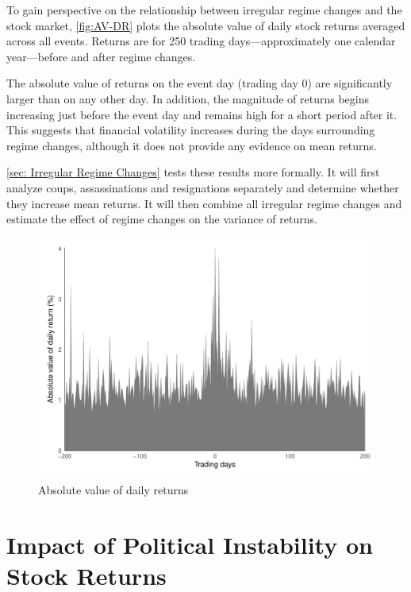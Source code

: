 \documentclass[12pt,final,fleqn]{article}
\theoremstyle{plain}
\begin{document}
To gain perspective on the relationship between irregular regime changes and the stock market, \autoref{fig:AV-DR} plots the absolute value of daily stock returns averaged across all events. Returns are for 250 trading days---approximately one calendar year---before and after regime changes.

The absolute value of returns on the event day (trading day 0) are significantly larger than on any other day. In addition, the magnitude of returns begins increasing just before the event day and remains high for a short period after it. This suggests that financial volatility increases during the days surrounding regime changes, although it does not provide any evidence on mean returns.

\autoref{sec: Irregular Regime Changes} tests these results more formally. It will first analyze coups, assassinations and resignations separately and determine whether they increase mean returns. It will then combine all irregular regime changes and estimate the effect of regime changes on the variance of returns.

\begin{figure}[!ht]
\includegraphics{../figs/daily_mean_absreturn.pdf}
\caption{Absolute value of daily returns}
\label{fig:AV-DR}
\end{figure}


\section{Impact of Political Instability on Stock Returns} \label{sec: Impact of Political Instability on Stock Returns}
\end{document}
